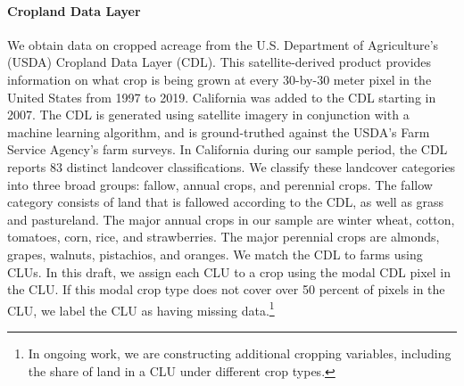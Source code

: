 \paragraph{Cropland Data Layer} We obtain data on cropped acreage from the U.S. Department of Agriculture's (USDA) Cropland Data Layer (CDL). This satellite-derived product provides information on what crop is being grown at every 30-by-30 meter pixel in the United States from 1997 to 2019. California was added to the CDL starting in 2007. The CDL is generated using satellite imagery in conjunction with a machine learning algorithm, and is ground-truthed against the USDA's Farm Service Agency's farm surveys. In California during our sample period, the CDL reports 83 distinct landcover classifications. We classify these landcover categories into three broad groups: fallow, annual crops, and perennial crops. The fallow category consists of land that is fallowed according to the CDL, as well as grass and pastureland. The major annual crops in our sample are winter wheat, cotton, tomatoes, corn, rice, and strawberries. The major perennial crops are almonds, grapes, walnuts, pistachios, and oranges. 
We match the CDL to farms using CLUs. In this draft, we assign each CLU to a crop using the modal CDL pixel in the CLU. If this modal crop type does not cover over 50 percent of pixels in the CLU, we label the CLU as having missing data.\footnote{In ongoing work, we are constructing additional cropping variables, including the share of land in a CLU under different crop types.} 
